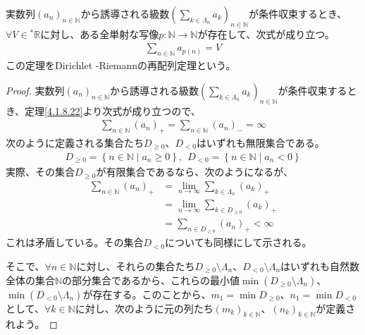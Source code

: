 \documentclass[dvipdfmx]{jsarticle}
\begin{document}
\begin{thm}\label{4.1.8.23}
実数列$\left( a_{n} \right)_{n \in \mathbb{N}}$から誘導される級数$\left( \sum_{k \in \varLambda_{n}} a_{k} \right)_{n \in \mathbb{N}}$が条件収束するとき、$\forall V \in{}^{*}\mathbb{R}$に対し、ある全単射な写像$p:\mathbb{N} \rightarrow \mathbb{N}$が存在して、次式が成り立つ。
\begin{align*}
\sum_{n \in \mathbb{N}} a_{p(n)} = V
\end{align*}
この定理をDirichlet -Riemannの再配列定理という。
\end{thm}
\begin{proof}
実数列$\left( a_{n} \right)_{n \in \mathbb{N}}$から誘導される級数$\left( \sum_{k \in \varLambda_{n}} a_{k} \right)_{n \in \mathbb{N}}$が条件収束するとき、定理\ref{4.1.8.22}より次式が成り立つので、
\begin{align*}
\sum_{n \in \mathbb{N}} \left( a_{n} \right)_{+} = \sum_{n \in \mathbb{N}} \left( a_{n} \right)_{-} = \infty
\end{align*}
次のように定義される集合たち$D_{\geq 0}$、$D_{< 0}$はいずれも無限集合である。
\begin{align*}
D_{\geq 0} = \left\{ n \in \mathbb{N} \middle| a_{n} \geq 0 \right\},\ \ D_{< 0} = \left\{ n \in \mathbb{N} \middle| a_{n} < 0 \right\}
\end{align*}
実際、その集合$D_{\geq 0}$が有限集合であるなら、次のようになるが、
\begin{align*}
\sum_{n \in \mathbb{N}} \left( a_{n} \right)_{+} &= \lim_{n \rightarrow \infty}{\sum_{k \in \varLambda_{n}} \left( a_{k} \right)_{+}}\\
&= \lim_{n \rightarrow \infty}{\sum_{k \in D_{\geq 0}} \left( a_{k} \right)_{+}}\\
&= \sum_{n \in D_{\geq 0}} \left( a_{n} \right)_{+} < \infty
\end{align*}
これは矛盾している。その集合$D_{< 0}$についても同様にして示される。\par
そこで、$\forall n \in \mathbb{N}$に対し、それらの集合たち$D_{\geq 0} \setminus \varLambda_{n}$、$D_{< 0} \setminus \varLambda_{n}$はいずれも自然数全体の集合$\mathbb{N}$の部分集合であるから、これらの最小値$\min\left( D_{\geq 0} \setminus \varLambda_{n} \right)$、$\min\left( D_{< 0} \setminus \varLambda_{n} \right)$が存在する。このことから、$m_{1} = \min D_{\geq 0}$、$n_{1} = \min D_{< 0}$として、$\forall k \in \mathbb{N}$に対し、次のように元の列たち$\left( m_{k} \right)_{k \in \mathbb{N}}$、$\left( n_{k} \right)_{k \in \mathbb{N}}$が定義されよう。

\end{proof}
\end{document}
